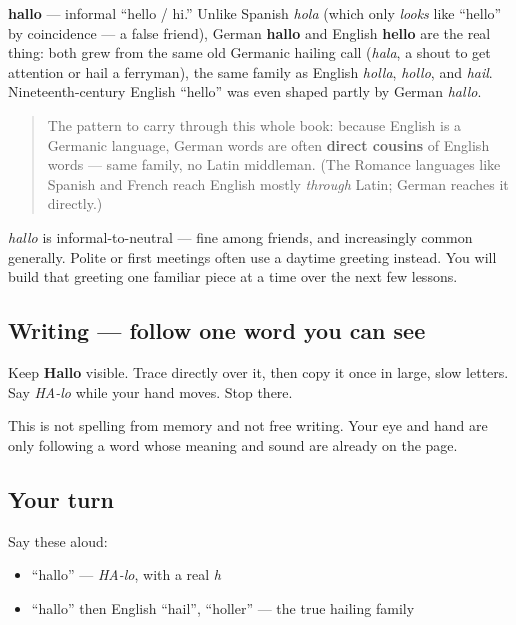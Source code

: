 \begin{cousinweb}
\textbf{hallo} — informal \textquotedblleft{}hello / hi.\textquotedblright{} Unlike Spanish \emph{hola} (which only \emph{looks} like \textquotedblleft{}hello\textquotedblright{} by coincidence — a false friend), German \textbf{hallo} and English \textbf{hello} are the real thing: both grew from the same old Germanic hailing call (\emph{hala}, a shout to get attention or hail a ferryman), the same family as English \emph{holla}, \emph{hollo}, and \emph{hail}. Nineteenth-century English \textquotedblleft{}hello\textquotedblright{} was even shaped partly by German \emph{hallo}.

\begin{quote}
The pattern to carry through this whole book: because English is a Germanic language, German words are often \textbf{direct cousins} of English words — same family, no Latin middleman. (The Romance languages like Spanish and French reach English mostly \emph{through} Latin; German reaches it directly.)
\end{quote}
\end{cousinweb}

\begin{culture}
\emph{hallo} is informal-to-neutral — fine among friends, and increasingly common generally. Polite or first meetings often use a daytime greeting instead. You will build that greeting one familiar piece at a time over the next few lessons.
\end{culture}

\subsection*{Writing — follow one word you can see}
Keep \textbf{Hallo} visible. Trace directly over it, then copy it once in large, slow letters. Say \emph{HA-lo} while your hand moves. Stop there.

This is not spelling from memory and not free writing. Your eye and hand are only following a word whose meaning and sound are already on the page.

\subsection*{Your turn}
Say these aloud:

\begin{itemize}
\raggedright
  \item \textquotedblleft{}hallo\textquotedblright{} — \emph{HA-lo}, with a real \emph{h}
  \item \textquotedblleft{}hallo\textquotedblright{} then English \textquotedblleft{}hail\textquotedblright{}, \textquotedblleft{}holler\textquotedblright{} — the true hailing family
\end{itemize}

